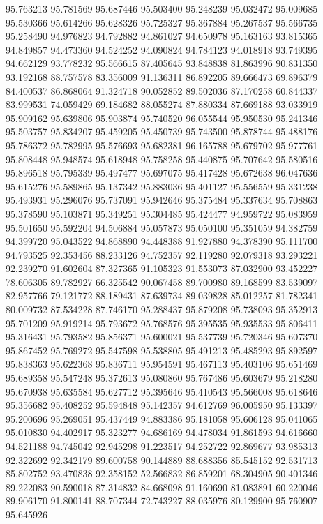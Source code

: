 95.763213
95.781569
95.687446
95.503400
95.248239
95.032472
95.009685
95.530366
95.614266
95.628326
95.725327
95.367884
95.267537
95.566735
95.258490
94.976823
94.792882
94.861027
94.650978
95.163163
93.815365
94.849857
94.473360
94.524252
94.090824
94.784123
94.018918
93.749395
94.662129
93.778232
95.566615
87.405645
93.848838
81.863996
90.831350
93.192168
88.757578
83.356009
91.136311
86.892205
89.666473
69.896379
84.400537
86.868064
91.324718
90.052852
89.502036
87.170258
60.844337
83.999531
74.059429
69.184682
88.055274
87.880334
87.669188
93.033919
95.909162
95.639806
95.903874
95.740520
96.055544
95.950530
95.241346
95.503757
95.834207
95.459205
95.450739
95.743500
95.878744
95.488176
95.786372
95.782995
95.576693
95.682381
96.165788
95.679702
95.977761
95.808448
95.948574
95.618948
95.758258
95.440875
95.707642
95.580516
95.896518
95.795339
95.497477
95.697075
95.417428
95.672638
96.047636
95.615276
95.589865
95.137342
95.883036
95.401127
95.556559
95.331238
95.493931
95.296076
95.737091
95.942646
95.375484
95.337634
95.708863
95.378590
95.103871
95.349251
95.304485
95.424477
94.959722
95.083959
95.501650
95.592204
94.506884
95.057873
95.050100
95.351059
94.382759
94.399720
95.043522
94.868890
94.448388
91.927880
94.378390
95.111700
94.793525
92.353456
88.233126
94.752357
92.119280
92.079318
93.293221
92.239270
91.602604
87.327365
91.105323
91.553073
87.032900
93.452227
78.606305
89.782927
66.325542
90.067458
89.700980
89.168599
83.539097
82.957766
79.121772
88.189431
87.639734
89.039828
85.012257
81.782341
80.009732
87.534228
87.746170
95.288437
95.879208
95.738093
95.352913
95.701209
95.919214
95.793672
95.768576
95.395535
95.935533
95.806411
95.316431
95.793582
95.856371
95.600021
95.537739
95.720346
95.607370
95.867452
95.769272
95.547598
95.538805
95.491213
95.485293
95.892597
95.838363
95.622368
95.836711
95.954591
95.467113
95.403106
95.651469
95.689358
95.547248
95.372613
95.080860
95.767486
95.603679
95.218280
95.670938
95.635584
95.627712
95.395646
95.410543
95.566008
95.618646
95.356682
95.408252
95.594848
95.142357
94.612769
96.005950
95.133397
95.200696
95.269051
95.437449
94.883386
95.181058
95.606128
95.041065
95.010830
94.402917
95.323277
94.686169
94.478034
91.861593
94.616660
94.521188
94.745042
92.945298
91.223517
94.252722
92.869677
93.985313
92.322692
92.342179
89.600758
90.144889
88.688356
85.545152
92.531713
85.802752
93.470838
92.358152
52.566832
86.859201
68.304905
90.401346
89.222083
90.590018
87.314832
84.668098
91.160690
81.083891
60.220046
89.906170
91.800141
88.707344
72.743227
88.035976
80.129900
95.760907
95.645926
